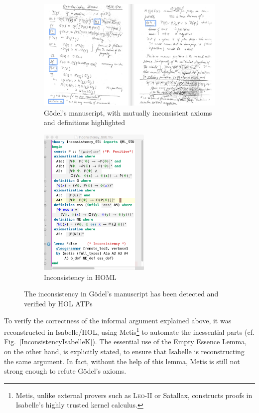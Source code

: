 \documentclass{article}
\begin{document}
\begin{figure}[t]
  \centering
  \begin{subfigure}[t]{0.715\textwidth}
    \includegraphics[width=\textwidth]{./Images/Manuscript2.png}
    \caption{G\"{o}del's manuscript, with mutually inconsistent axioms and
      definitions highlighted} \label{GoedelScript} 
  \end{subfigure}
   \begin{subfigure}[t]{0.28\textwidth}
     \includegraphics[width=\textwidth,height=7.2cm]{./Images/Inconsistency_S5U_direct.png}
     \caption{Inconsistency in HOML \SFiveU} \label{Inconsistency_S5U} 
   \end{subfigure}
 \caption{The inconsistency in G\"{o}del's manuscript has been
   detected and verified by HOL ATPs} 
\end{figure}
To verify the correctness of the informal argument explained above, it
was reconstructed in Isabelle/HOL, using Metis\footnote{Metis, unlike
  external provers such as \textsc{Leo-II} or Satallax, 
  constructs proofs in Isabelle's highly trusted kernel calculus.} to automate the
inessential parts (cf. Fig.~\ref {InconsistencyIsabelleK}). The essential use of the Empty Essence Lemma, on
the other hand, is explicitly stated, to ensure that Isabelle is
reconstructing the same argument. In fact, without the help of this
lemma, Metis is still not strong enough to refute G\"odel's
axioms.
\end{document}

